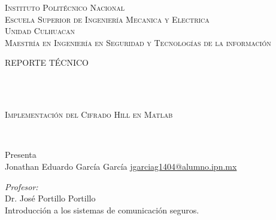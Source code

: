 \begin{center}
    \textsc{\huge Instituto Polit\'ecnico Nacional}\\[1cm] 
    \textsc{\LARGE Escuela Superior de Ingenier\'ia Mecanica y Electrica}\\[0.5cm] %
    \textsc{\LARGE Unidad Culhuacan}\\[0.5cm] %
    \textsc{\LARGE Maestría en Ingeniería en Seguridad y Tecnologías de la información }\\[1cm] %
    
    \begin{minipage}{0.9\textwidth} 
    \begin{center}																					%
    \textsc{\LARGE REPORTE TÉCNICO}
    \end{center}
    \end{minipage}\\[0.5cm]
                 \vspace*{1cm}															%
    \HRule \\[0.1cm]																	%
    \begin{center} \textsc{\Large Implementación del Cifrado Hill en Matlab\\}
    \end{center}
    \HRule \\[0.1cm]%
    
    
    
    
       \vspace{0.8cm}
    \begin{center}
    {\large Presenta}\\                                                                %
    Jonathan Eduardo García García\hspace{1cm} \href{mailto:jgarciag1404@alumno.ipn.mx}{jgarciag1404@alumno.ipn.mx}
    \vspace{1 cm}
    \end{center}
    
    \begin{center}
    \begin{minipage}{1\textwidth}													    %
    \begin{flushleft} \large														    %
    \emph{Profesor:}\\
    \vspace{0.3cm}
    Dr. José Portillo Portillo\\
        Introducción a los sistemas de comunicación seguros.
        \vspace*{1cm}	
    \end{flushleft}	
    \end{minipage}		                                            %
    \end{center}
    

\end{center}
